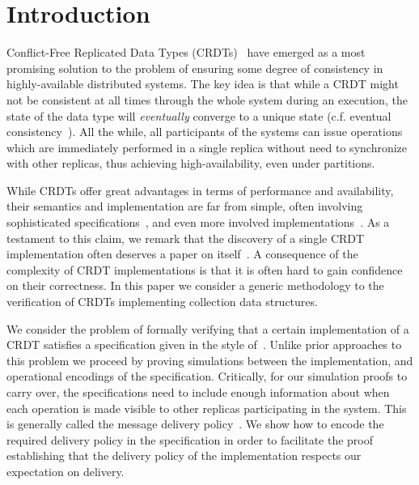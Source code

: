 \section{Introduction}
\label{sec:introduction}

Conflict-Free Replicated Data Types (CRDTs)~\cite{Shapiro:2011} have
emerged as a most promising solution to the problem of ensuring
some degree of consistency in highly-available distributed systems.
%
The key idea is that while a CRDT might not be consistent at all times
through the whole system during an execution, the state of the
data type will \emph{eventually} converge to a unique state (c.f.
eventual consistency~\cite{Burckhardt:2014b}).
%
All the while, all participants of the systems can issue operations
which are immediately performed in a single replica without need to
synchronize with other replicas, thus achieving high-availability,
even under partitions.

While CRDTs offer great advantages in terms of performance and
availability, their semantics and implementation are far from simple,
often involving sophisticated specifications~\cite{Burckhardt:2014b}, and
even more involved implementations~\cite{Shapiro:2011}.
%
As a testament to this claim, we remark that the discovery of a single
CRDT implementation often deserves a paper on itself~\cite{RohJKL11,KleppmannB17}.
%
A consequence of the complexity of CRDT implementations is that it is
often hard to gain confidence on their correctness.
%
In this paper we consider a generic methodology to the verification of
CRDTs implementing collection data structures.

We consider the problem of formally verifying that a certain
implementation of a CRDT satisfies a specification given in the
style of~\cite{Burckhardt:2014}.
%
Unlike prior approaches to this problem we proceed by
proving simulations between the implementation, and operational
encodings of the specification.
%
Critically, for our simulation proofs to carry over, the
specifications need to include enough information about when each
operation is made visible to other replicas participating in the
system.
%
This is generally called the message delivery policy~\cite{}.
%
We show how to encode the required delivery policy in the
specification in order to facilitate the proof establishing that the
delivery policy of the implementation respects our expectation on
delivery. 


